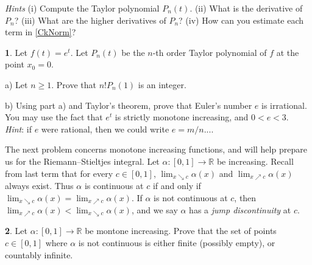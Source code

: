 \documentclass[12pt]{article}
\newcommand{\RR}{\mathbb{R}}
\theoremstyle{definition}
\newtheorem{problem}{}
\begin{document}
\medskip


\noindent\emph{Hints} (i) Compute the Taylor polynomial $P_n(t)$. (ii) What is the derivative of $P_n$? (iii) What are the higher derivatives of $P_n$? (iv) How can you estimate each term in \eqref{CkNorm}?


\medskip

\begin{problem}
Let $f(t) = e^t$. Let $P_n(t)$ be the $n$-th order Taylor polynomial of $f$ at the point $x_0=0$.

\medskip

\noindent a) Let $n\geq 1$. Prove that $n!P_n(1)$ is an integer.

\medskip

\noindent b) Using part a) and Taylor's theorem, prove that Euler's number $e$ is irrational. You may use the fact that $e^t$ is strictly monotone increasing, and $0<e<3$.\\
\emph{Hint}: if $e$ were rational, then we could write $e=m/n$....
\end{problem}




\medskip
The next problem concerns monotone increasing functions, and will help prepare us for the Riemann–Stieltjes integral. Let $\alpha\colon [0,1]\to\RR$ be increasing. Recall from last term that for every $c\in[0,1]$, $\lim_{x\searrow c}\alpha(x)$ and $\lim_{x\nearrow c}\alpha(x)$ always exist. Thus $\alpha$ is continuous at $c$ if and only if $\lim_{x\searrow c}\alpha(x)=\lim_{x\nearrow c}\alpha(x)$. If $\alpha$ is not continuous at $c$, then $\lim_{x\nearrow c}\alpha(x) < \lim_{x\searrow c}\alpha(x)$, and we say $\alpha$ has a \emph{jump discontinuity} at $c$.

\begin{problem}
Let $\alpha\colon [0,1]\to\RR$ be montone increasing. Prove that the set of points $c\in [0,1]$ where $\alpha$ is not continuous is either finite (possibly empty), or countably infinite.
\end{problem}
\end{document}

